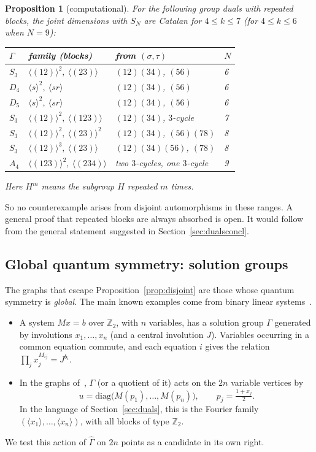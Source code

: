 \documentclass[11pt]{amsart}
\newtheorem{proposition}[theorem]{Proposition}
\theoremstyle{definition}
\theoremstyle{remark}
\theoremstyle{plain}
\numberwithin{equation}{section}
\numberwithin{table}{section}
\newcommand{\Z}{\mathbb Z}
\begin{document}
\begin{proposition}[computational]\label{prop:repeated}
For the following group duals with repeated blocks, the joint dimensions with $S_N$ are Catalan for $4\le k\le7$ (for $4\le k\le6$ when $N=9$):
\begin{center}
\begin{tabular}{@{}llll@{}}\toprule
$\Gamma$ & family (blocks) & from $(\sigma,\tau)$ & $N$\\\midrule
$S_3$ & $\langle(12)\rangle^2,\ \langle(23)\rangle$ & $(12)(34)$, $(56)$ & 6\\
$D_4$ & $\langle s\rangle^2,\ \langle sr\rangle$ & $(12)(34)$, $(56)$ & 6\\
$D_5$ & $\langle s\rangle^2,\ \langle sr\rangle$ & $(12)(34)$, $(56)$ & 6\\
$S_3$ & $\langle(12)\rangle^2,\ \langle(123)\rangle$ & $(12)(34)$, $3$-cycle & 7\\
$S_3$ & $\langle(12)\rangle^2,\ \langle(23)\rangle^2$ & $(12)(34)$, $(56)(78)$ & 8\\
$S_3$ & $\langle(12)\rangle^3,\ \langle(23)\rangle$ & $(12)(34)(56)$, $(78)$ & 8\\
$A_4$ & $\langle(123)\rangle^2,\ \langle(234)\rangle$ & two $3$-cycles, one $3$-cycle & 9\\\bottomrule
\end{tabular}
\end{center}
Here $H^m$ means the subgroup $H$ repeated $m$ times.
\end{proposition}

So no counterexample arises from disjoint automorphisms in these ranges. A general proof that repeated blocks are always absorbed is open. It would follow from the general statement suggested in Section~\ref{sec:dualsconcl}.

\subsection{Global quantum symmetry: solution groups}

The graphs that escape Proposition~\ref{prop:disjoint} are those whose quantum symmetry is \emph{global}. The main known examples come from binary linear systems~\cite{drs,rs}.
\begin{itemize}
\item A system $Mx=b$ over $\Z_2$, with $n$ variables, has a solution group $\Gamma$ generated by involutions $x_1,\dots,x_n$ (and a central involution $J$). Variables occurring in a common equation commute, and each equation $i$ gives the relation $\prod_{j}x_j^{M_{ij}}=J^{b_i}$.
\item In the graphs of~\cite{drs,rs}, $\Gamma$ (or a quotient of it) acts on the $2n$ variable vertices by
\[
u=\mathrm{diag}\big(M(p_1),\dots,M(p_n)\big),\qquad p_j=\tfrac{1+x_j}2 .
\]
In the language of Section~\ref{sec:duals}, this is the Fourier family $(\langle x_1\rangle,\dots,\langle x_n\rangle)$, with all blocks of type $\Z_2$.
\end{itemize}
We test this action of $\widehat\Gamma$ on $2n$ points as a candidate in its own right.
\end{document}
